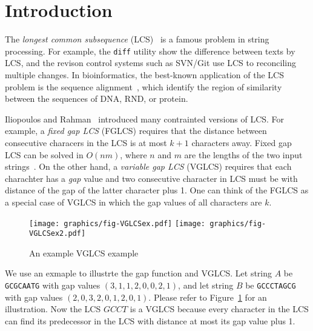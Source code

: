 \section{Introduction} %
\label{sec:Introduction}


The {\em longest common subsequence} (LCS)~\cite{Hirschberg1975ALS} is
a famous problem in string processing.  For example, the \texttt{diff}
utility show the difference between texts by LCS, and the revison
control systems such as SVN/Git use LCS to reconciling multiple
changes.  In bioinformatics, the best-known application of the LCS
problem is the sequence alignment~\cite{mount2001bioinformatics,
Ann2010EfficientAF}, which identify the region of similarity between
the sequences of DNA, RND, or protein.


\iffalse 最長共同子序列 (\emph{longest common subsequence}, LCS) 廣泛
地使用在各個應用上。在多核心平台下，大多數的研究專注於如何高效率地在波
前平行 (wavefront parallelism)，而 Jiaoyun Yang ~\cite{jiaoyun} 提出的
論文中改變一般的 LCS 遞迴定義以得到更好快取使用率。在這篇論文中，針對
在 Iliopoulos 和 Rahman ~\cite{iliopoulos} 提及的約束條件下的 LCS 問題
使用相關的想法來改善效能。\fi


Iliopoulos and Rahman~\cite{Rahman2006AlgorithmsFC} introduced many
contrainted versions of LCS.  For example, a {\em fixed gap LCS}
(FGLCS) requires that the distance between consecutive characers in
the LCS is at most $k + 1$ characters away.  Fixed gap LCS can be
solved in $O(nm)$, where $n$ and $m$ are the lengths of the two input
strings~\cite{citation}.  On the other hand, a {\em variable   gap
LCS} (VGLCS) requires that each charachter has a {\em gap} value and
two consecutive character in LCS must be with distance of the gap of
the latter character plus 1.  One can think of the FGLCS as a special
case of VGLCS in which the gap values of all characters are $k$.

\begin{figure}[!thb]
  \centering
  \texttt{[image: graphics/fig-VGLCSex.pdf]}
  \texttt{[image: graphics/fig-VGLCSex2.pdf]}
  \caption{An example VGLCS example}    \label{fig:VGLCSex}
\end{figure}

We use an exmaple to illustrte the gap function and VGLCS.  Let string
$A$ be {\tt GCGCAATG} with gap values $(3, 1, 1, 2, 0, 0, 2, 1)$, and
let string $B$ be {\tt GCCCTAGCG} with gap values $(2, 0, 3, 2, 0, 1,
2, 0, 1)$.  Please refer to Figure~\ref{fig:VGLCSex} for an
illustration.  Now the LCS $GCCT$ is a VGLCS because every character
in the LCS can find its predecessor in the LCS with distance at most
its gap value plus 1.

